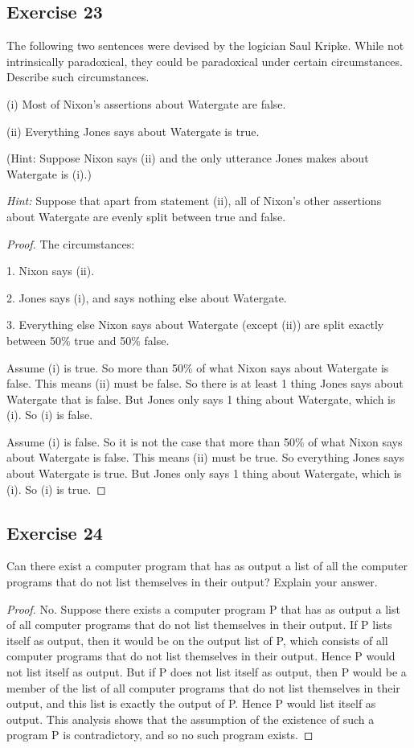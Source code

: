 \documentclass[14pt]{extarticle}
\begin{document}
\subsection{Exercise 23}
The following two sentences were devised by the logician Saul Kripke. While not intrinsically paradoxical, they
could be paradoxical under certain circumstances. Describe such circumstances.

(i) Most of Nixon’s assertions about Watergate are false.

(ii) Everything Jones says about Watergate is true.

(Hint: Suppose Nixon says (ii) and the only utterance Jones makes about Watergate is (i).)

{\it Hint:} Suppose that apart from statement (ii), all of
Nixon’s other assertions about Watergate are evenly split
between true and false.

\begin{proof}
  The circumstances:

  1. Nixon says (ii).

  2. Jones says (i), and says nothing else about Watergate.

  3. Everything else Nixon says about Watergate (except (ii)) are split exactly between 50\% true and 50\% false.

  Assume (i) is true. So more than 50\% of what Nixon says about Watergate is false. This means (ii) must be false.
  So there is at least 1 thing Jones says about Watergate that is false. But Jones only says 1 thing about Watergate,
  which is (i). So (i) is false.

  Assume (i) is false. So it is not the case that more than 50\% of what Nixon says about Watergate is false. This means (ii) must be true. So everything Jones says about Watergate is true. But Jones only says 1 thing about Watergate, which is (i). So (i) is true.
\end{proof}

\subsection{Exercise 24}
Can there exist a computer program that has as output a list of all the computer programs that do not list
themselves in their output? Explain your answer.

\begin{proof}
  No. Suppose there exists a computer program P that has as output a list of all computer programs that do not list
  themselves in their output. If P lists itself as output, then it would be on the output list of P, which consists of
  all computer programs that do not list themselves in their output. Hence P would not list itself as output. But if P
  does not list itself as output, then P would be a member of the list of all computer programs that do not list
  themselves in their output, and this list is exactly the output of P. Hence P would list itself as output. This
  analysis shows that the assumption of the existence of such a program P is contradictory, and so no such program exists.
\end{proof}
\end{document}
